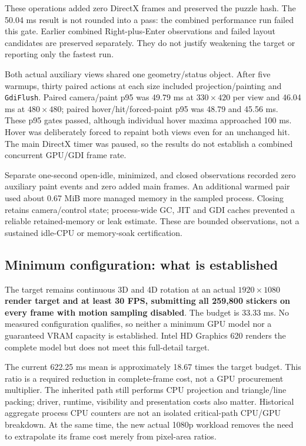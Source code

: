 \documentclass[a4paper,11pt]{article}
\begin{document}
These operations added zero DirectX frames and preserved the puzzle hash. The 50.04 ms result is not rounded into a pass: the combined performance run failed this gate. Earlier combined Right-plus-Enter observations and failed layout candidates are preserved separately. They do not justify weakening the target or reporting only the fastest run.

Both actual auxiliary views shared one geometry/status object. After five warmups, thirty paired actions at each size included projection/painting and \texttt{GdiFlush}. Paired camera/paint p95 was 49.79 ms at \(330\times420\) per view and 46.04 ms at \(480\times480\); paired hover/hit/forced-paint p95 was 48.79 and 45.56 ms. These p95 gates passed, although individual hover maxima approached 100 ms. Hover was deliberately forced to repaint both views even for an unchanged hit. The main DirectX timer was paused, so the results do not establish a combined concurrent GPU/GDI frame rate.

Separate one-second open-idle, minimized, and closed observations recorded zero auxiliary paint events and zero added main frames. An additional warmed pair used about 0.67 MiB more managed memory in the sampled process. Closing retains camera/control state; process-wide GC, JIT and GDI caches prevented a reliable retained-memory or leak estimate. These are bounded observations, not a sustained idle-CPU or memory-soak certification.

\subsection{Minimum configuration: what is established}

The target remains continuous 3D and 4D rotation at an actual \textbf{\(1920\times1080\) render target and at least 30 FPS, submitting all 259,800 stickers on every frame with motion sampling disabled}. The budget is 33.33 ms. No measured configuration qualifies, so neither a minimum GPU model nor a guaranteed VRAM capacity is established. Intel HD Graphics 620 renders the complete model but does not meet this full-detail target.

The current 622.25 ms mean is approximately 18.67 times the target budget. This ratio is a required reduction in complete-frame cost, not a GPU procurement multiplier. The inherited path still performs CPU projection and triangle/line packing; driver, runtime, visibility and presentation costs also matter. Historical aggregate process CPU counters are not an isolated critical-path CPU/GPU breakdown. At the same time, the new actual 1080p workload removes the need to extrapolate its frame cost merely from pixel-area ratios.
\end{document}
